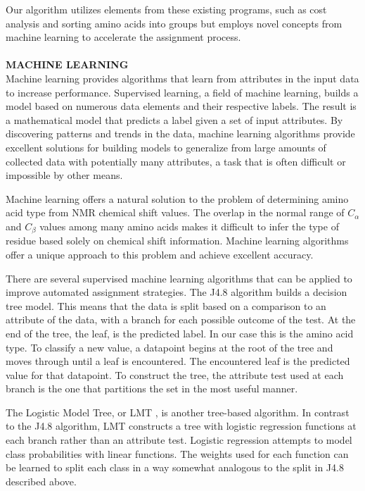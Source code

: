 \documentclass{article}
\begin{document}
\indent Our algorithm utilizes elements from these existing programs, such as cost analysis and sorting amino acids into groups but employs novel concepts from machine learning to accelerate the assignment process.
\\\\
\noindent\textbf{MACHINE LEARNING}\\
\indent Machine learning provides algorithms that learn from attributes in the input data to increase performance. Supervised learning, a field of machine learning, builds a model based on numerous data elements and their respective labels. The result is a mathematical model that predicts a label given a set of input attributes. By discovering patterns and trends in the data, machine learning algorithms provide excellent solutions for building models to generalize from large amounts of collected data with potentially many attributes, a task that is often difficult or impossible by other means.

\indent Machine learning offers a natural solution to the problem of determining amino acid type from NMR chemical shift values. The overlap in the normal range of $C_{\alpha}$ and $C_{\beta}$ values among many amino acids makes it difficult to infer the type of residue based solely on chemical shift information. Machine learning algorithms offer a unique approach to this problem and achieve excellent accuracy.

\indent There are several supervised machine learning algorithms that can be applied to improve automated assignment strategies. The J4.8 algorithm \cite{j48_algorithm} builds a decision tree model. This means that the data is split based on a comparison to an attribute of the data, with a branch for each possible outcome of the test. At the end of the tree, the leaf, is the predicted label. In our case this is the amino acid type. To classify a new value, a datapoint begins at the root of the tree and moves through until a leaf is encountered. The encountered leaf is the predicted value for that datapoint. To construct the tree, the attribute test used at each branch is the one that partitions the set in the most useful manner.

\indent The Logistic Model Tree, or LMT \cite{lmt_algorithm}, is another tree-based algorithm. In contrast to the J4.8 algorithm, LMT constructs a tree with logistic regression functions at each branch rather than an attribute test. Logistic regression attempts to model class probabilities with linear functions. The weights used for each function can be learned to split each class in a way somewhat analogous to the split in J4.8 described above.
\end{document}
